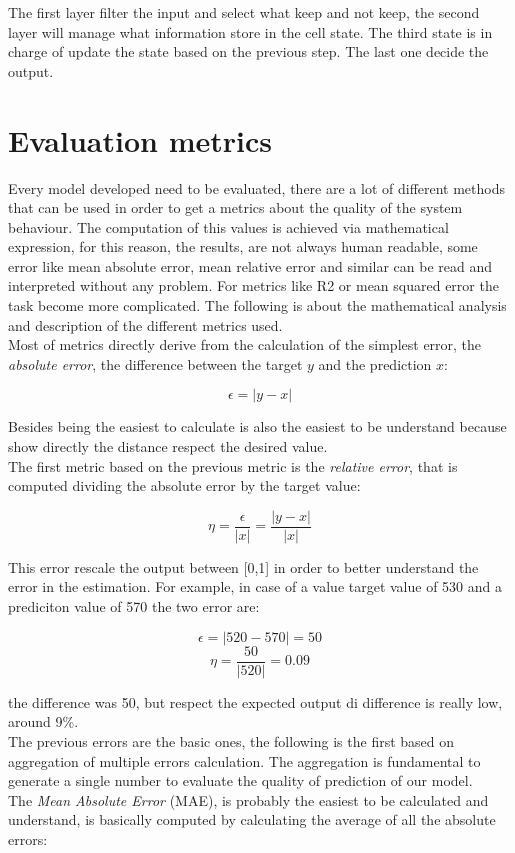 \documentclass[%
    corpo=12pt,
    twoside,
    oldstyle,
    autoretitolo,
    greek,
    evenboxes,
]{toptesi}
\begin{document}
The first layer filter the input and select what keep and not keep, the second layer will manage what information store in the cell state. The third state is in charge of update the state based on the previous step. The last one decide the output.


\section{Evaluation metrics}
Every model developed need to be evaluated, there are a lot of different methods that can be used in order to get a metrics about the quality of the system behaviour. The computation of this values is achieved via mathematical expression, for this reason, the results, are not always human readable, some error like mean absolute error, mean relative error and similar can be read and interpreted without any problem. For metrics like R2 or mean squared error the task become more complicated. The following is about the mathematical analysis and description of the different metrics used.\\
Most of metrics directly derive from the calculation of the simplest error, the \textit{absolute error}, the difference between the target $y$ and the prediction $x$:
\begin{center}
  \begin{equation}
    \epsilon = |y - x|
  \end{equation}
\end{center}
Besides being the easiest to calculate is also the easiest to be understand because show directly the distance respect the desired value.\\
The first metric based on the previous metric is the \textit{relative error}, that is computed dividing the absolute error by the target value:
\begin{center}
  \begin{equation}
    \eta = \frac{\epsilon}{|x|} = \frac{|y - x|}{|x|}
  \end{equation}
\end{center}
This error rescale the output between [0,1] in order to better understand the error in the estimation.
For example, in case of a value target value of 530 and a prediciton value of 570 the two error are:
\begin{center}
  \begin{equation}
      \epsilon = |520-570| = 50
  \end{equation}
  \begin{equation}
      \eta = \frac{50}{|520|} = 0.09
  \end{equation}
\end{center}
the difference was 50, but respect the expected output di difference is really low, around 9\%.\\
The previous errors are the basic ones, the following is the first based on aggregation of multiple errors calculation. The aggregation is fundamental to generate a single number to evaluate the quality of prediction of our model.\\
The \textit{Mean Absolute Error} (MAE), is probably the easiest to be calculated and understand, is basically computed by calculating the average of all the absolute errors:
\end{document}
